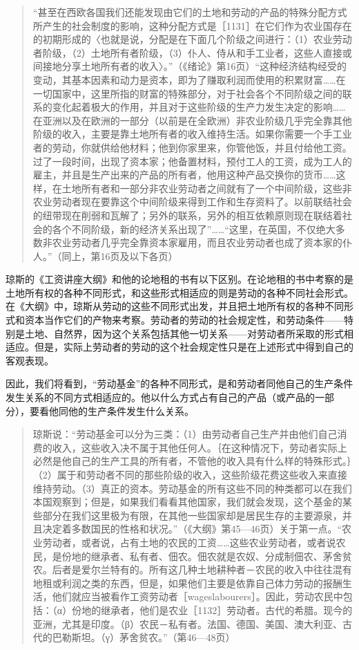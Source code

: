 \begin{quote}{“甚至在西欧各国我们还能发现由它们的土地和劳动的产品的特殊分配方式所产生的社会制度的影响，这种分配方式是［1131］在它们作为农业国存在的初期形成的〈也就是说，分配是在下面几个阶级之间进行：（1）农业劳动者阶级，（2）土地所有者阶级，（3）仆人、侍从和手工业者，这些人直接或间接地分享土地所有者的收入〉。”（《绪论》第16页）“这种经济结构经受的变动，其基本因素和动力是资本，即为了赚取利润而使用的积累财富……在一切国家中，这里所指的财富的特殊部分，对于社会各个不同阶级之间的联系的变化起着极大的作用，并且对于这些阶级的生产力发生决定的影响……在亚洲以及在欧洲的一部分（以前是在全欧洲）非农业阶级几乎完全靠其他阶级的收入，主要是靠土地所有者的收入维持生活。如果你需要一个手工业者的劳动，你就供给他材料；他到你家里来，你管他饭，并且付给他工资。过了一段时间，出现了资本家；他备置材料，预付工人的工资，成为工人的雇主，并且是生产出来的产品的所有者，他用这种产品交换你的货币……这样，在土地所有者和一部分非农业劳动者之间就有了一个中间阶级，这些非农业劳动者现在要靠这个中间阶级来得到工作和生存资料了。以前联结社会的纽带现在削弱和瓦解了；另外的联系，另外的相互依赖原则现在联结着社会的各个不同阶级，新的经济关系出现了”……“这里，在英国，不仅绝大多数非农业劳动者几乎完全靠资本家雇用，而且农业劳动者也成了资本家的仆人。”（同上，第16页及以下各页）}\end{quote}

琼斯的《工资讲座大纲》和他的论地租的书有以下区别。在论地租的书中考察的是土地所有权的各种不同形式，和这些形式相适应的则是劳动的各种不同社会形式。在《大纲》中，琼斯从劳动的这些不同形式出发，并且把土地所有权的各种不同形式和资本当作它们的产物来考察。劳动者的劳动的社会规定性，和劳动条件——特别是土地、自然界，因为这个关系包括其他一切关系——对劳动者所采取的形式相适应。但是，实际上劳动者的劳动的这个社会规定性只是在上述形式中得到自己的客观表现。

因此，我们将看到，“劳动基金”的各种不同形式，是和劳动者同他自己的生产条件发生关系的不同方式相适应的。他以什么方式占有自己的产品（或产品的一部分），要看他同他的生产条件发生什么关系。

\begin{quote}{琼斯说：“劳动基金可以分为三类：（1）由劳动者自己生产并由他们自己消费的收入，这些收入决不属于其他任何人。｛在这种情况下，劳动者实际上必然是他自己的生产工具的所有者，不管他的收入具有什么样的特殊形式。｝（2）属于和劳动者不同的那些阶级的收入，这些阶级花费这些收入来直接维持劳动。（3）真正的资本。劳动基金的所有这些不同的种类都可以在我们本国观察到；但是，如果我们看看其他国家，我们就会发现，这个基金的某些部分在我们这里极为有限，在其他一些国家却是居民生存的主要源泉，并且决定着多数国民的性格和状况。”（《大纲》第45—46页）关于第一点。“农业劳动者，或者说，占有土地的农民的工资……这些农业劳动者，或者说农民，是份地的继承者、私有者、佃农。佃农就是农奴、分成制佃农、茅舍贫农。后者是爱尔兰特有的。所有这几种土地耕种者－农民的收入中往往混有地租或利润之类的东西，但是，如果他们主要是依靠自己体力劳动的报酬生活，他们就应当被看作工资劳动者［wageslabourers］。因此，劳动农民中包括：（α）份地的继承者，他们是农业［1132］劳动者。古代的希腊。现今的亚洲，尤其是印度。（β）农民－私有者。法国、德国、美国、澳大利亚、古代的巴勒斯坦。（γ）茅舍贫农。”（第46—48页）}\end{quote}

